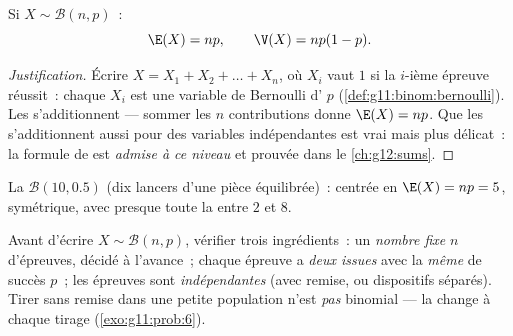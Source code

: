 \begin{proposition}\label{prop:g11:binom:expectation}
Si $X \sim \mathcal B(n, p)$~:
\[
\E(X) = np,
\qquad
\V(X) = np(1-p).
\]
\end{proposition}

\begin{proof}[Justification]
Écrire $X = X_1 + X_2 + \dots + X_n$, où $X_i$ vaut $1$ si la $i$-ième
épreuve réussit~: chaque $X_i$ est une variable de Bernoulli d'
$p$ (\cref{def:g11:binom:bernoulli}). Les  s'additionnent ---
sommer les $n$ contributions donne $\E(X) = np$. Que les \emph{}
s'additionnent aussi pour des variables indépendantes est vrai mais plus
délicat~: la formule de  est \emph{admise à ce niveau} et
prouvée dans le \cref{ch:g12:sums}.
\end{proof}

\begin{omfigure}

{\small La  $\mathcal B(10, 0.5)$ (dix lancers d'une pièce
équilibrée)~: centrée en $\E(X) = np = 5$, symétrique, avec presque toute
la  entre $2$ et $8$.}
\end{omfigure}

\begin{method}\label{met:g11:binom:recognize}
Avant d'écrire $X \sim \mathcal B(n, p)$, vérifier trois ingrédients~:
un \emph{nombre fixe} $n$ d'épreuves, décidé à l'avance~; chaque épreuve
a \emph{deux issues} avec la \emph{même}  de succès $p$~; les
épreuves sont \emph{indépendantes} (avec remise, ou dispositifs
séparés). Tirer sans remise dans une petite population n'est \emph{pas}
binomial --- la  change à chaque tirage
(\cref{exo:g11:prob:6}).
\end{method}

